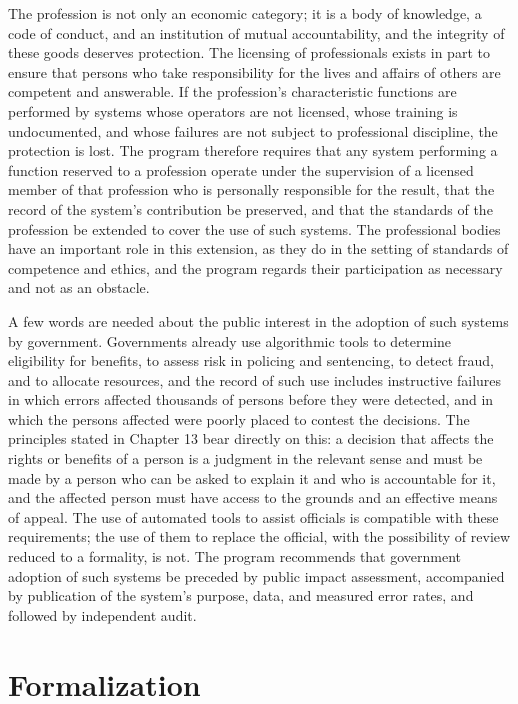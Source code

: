 The profession is not only an economic category; it is a body of knowledge, a code of conduct, and an institution of mutual accountability, and the integrity of these goods deserves protection. The licensing of professionals exists in part to ensure that persons who take responsibility for the lives and affairs of others are competent and answerable. If the profession's characteristic functions are performed by systems whose operators are not licensed, whose training is undocumented, and whose failures are not subject to professional discipline, the protection is lost. The program therefore requires that any system performing a function reserved to a profession operate under the supervision of a licensed member of that profession who is personally responsible for the result, that the record of the system's contribution be preserved, and that the standards of the profession be extended to cover the use of such systems. The professional bodies have an important role in this extension, as they do in the setting of standards of competence and ethics, and the program regards their participation as necessary and not as an obstacle.

A few words are needed about the public interest in the adoption of such systems by government. Governments already use algorithmic tools to determine eligibility for benefits, to assess risk in policing and sentencing, to detect fraud, and to allocate resources, and the record of such use includes instructive failures in which errors affected thousands of persons before they were detected, and in which the persons affected were poorly placed to contest the decisions. The principles stated in Chapter 13 bear directly on this: a decision that affects the rights or benefits of a person is a judgment in the relevant sense and must be made by a person who can be asked to explain it and who is accountable for it, and the affected person must have access to the grounds and an effective means of appeal. The use of automated tools to assist officials is compatible with these requirements; the use of them to replace the official, with the possibility of review reduced to a formality, is not. The program recommends that government adoption of such systems be preceded by public impact assessment, accompanied by publication of the system's purpose, data, and measured error rates, and followed by independent audit.

\section*{Formalization}

